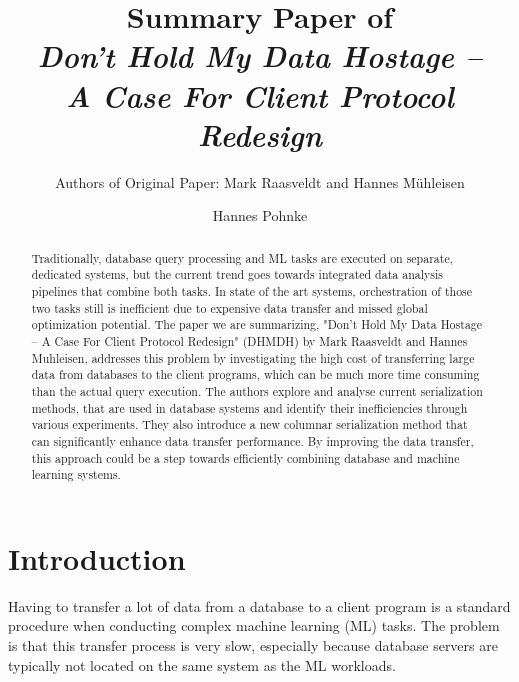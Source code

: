 \documentclass[sigconf]{acmart}
\begin{document}
\title{Summary Paper of \\ \textit{Don’t Hold My Data Hostage – \\A Case For Client Protocol Redesign}}
\subtitle{Authors of Original Paper: Mark Raasveldt and Hannes Mühleisen}


\author{Hannes Pohnke}


\begin{abstract}
Traditionally, database query processing and ML tasks are executed on separate, dedicated systems, but the current trend goes towards integrated data analysis pipelines that combine both tasks. In state of the art systems, orchestration of those two tasks still is inefficient due to expensive data transfer and missed global optimization potential. The paper we are summarizing, "Don’t Hold My Data Hostage – A Case For Client Protocol Redesign" (DHMDH) by Mark Raasveldt and Hannes Muhleisen, addresses this problem by investigating the high cost of transferring large data from databases to the client programs, which can be much more time consuming than the actual query execution. The authors explore and analyse current serialization methods, that are used in database systems and identify their inefficiencies through various experiments. They also introduce a new columnar serialization method that can significantly enhance data transfer performance. By improving the data transfer, this approach could be a step towards efficiently combining database and machine learning systems.
\end{abstract}


\maketitle

\section{Introduction}
Having to transfer a lot of data from a database to a client program is a standard procedure when conducting complex machine learning (ML) tasks. The problem is that this transfer process is very slow, especially because database servers are typically not located on the same system as the ML workloads. 
\end{document}
